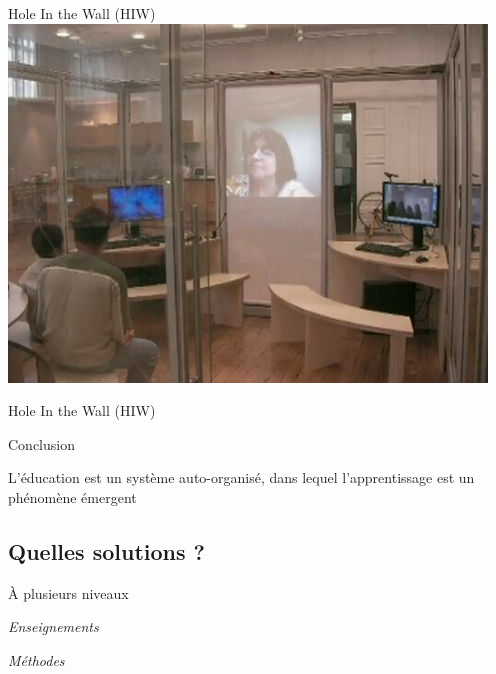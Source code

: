 \begin{frame}{Hole In the Wall (HIW)}
\includegraphics[width=.9\textwidth]{../resources/illustrations/soles.jpg}
\end{frame}

\begin{frame}{Hole In the Wall (HIW)}
  \begin{block}{Conclusion}
  
    \begin{center}
      
     \begin{coolquote}
      L'éducation est un système auto-organisé, dans lequel l'apprentissage est un phénomène émergent
    \end{coolquote}
    \end{center}
  \end{block}
\end{frame}

\subsection{Quelles solutions ?}

\begin{frame}{À plusieurs niveaux}
  \vfill
  \begin{center}
    \emph{\Huge Enseignements}
  \end{center}
  \vfill
  \begin{center}
    \emph{\Huge Méthodes}
  \end{center}
  \vfill
\end{frame}


